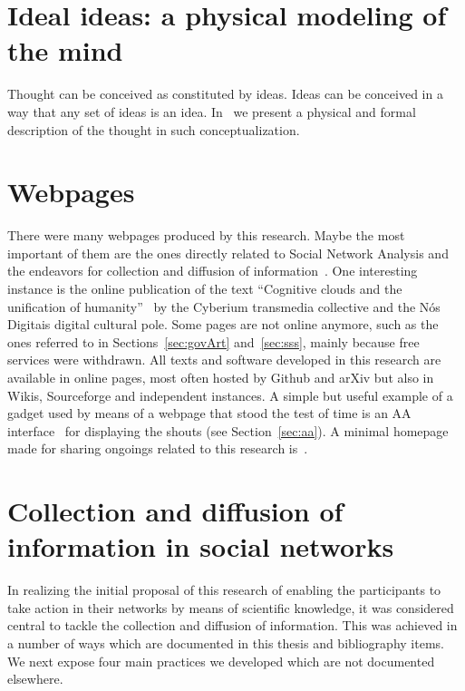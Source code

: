 \begin{apendicesenv}
\section{Ideal ideas: a physical modeling of the mind}
Thought can be conceived as constituted by ideas.
Ideas can be conceived in a way that any set of ideas is an idea.
In~\cite{idealIdeas} we present a physical and formal description of the
thought in such conceptualization.

\section{Webpages}
There were many webpages produced by this research.
Maybe the most important of them are the ones directly related
to Social Network Analysis and the endeavors for collection and diffusion of information~\cite{sfARS,rfARS}.
One interesting instance is the online publication of the text ``Cognitive clouds and the unification of humanity''~\cite{nuvens}
by the Cyberium transmedia collective and the Nós Digitais digital cultural pole.
Some pages are not online anymore, such as the ones referred to in Sections~\ref{sec:govArt} and~\ref{sec:sss},
mainly because free services were withdrawn.
All texts and software developed in this research are available in online pages,
most often hosted by Github and arXiv but also in Wikis, Sourceforge and independent instances.
A simple but useful example of a gadget used by means of a webpage that
stood the test of time is an AA interface~\cite{aaclient} for displaying the shouts
(see Section~\ref{sec:aa}).
A minimal homepage made for sharing ongoings related to this research is~\cite{ttmio}.

\section{Collection and diffusion of information in social networks}\label{sec:colDif}
In realizing the initial proposal of this research of enabling the participants to take action
in their networks by means of scientific knowledge, it was considered central
to tackle the collection and diffusion of information.
This was achieved in a number of ways which are documented in this thesis and bibliography items.
We next expose four main practices we developed which are not documented elsewhere.


\end{apendicesenv}
